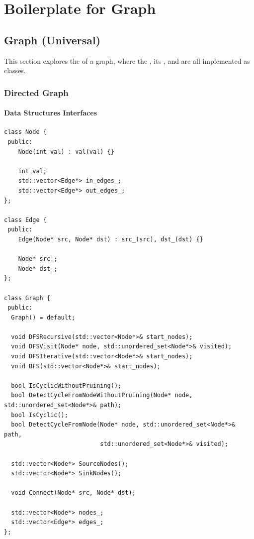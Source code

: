 \chapter{Boilerplate for Graph}\label{chap:graph_boilerplate}
\section{Graph (Universal)}
This section explores the {\color{blue}{universal implementation}} of a graph, where the {\color{blue}{graph}}, its {\color{blue}{nodes}}, and {\color{blue}{edges}} are all implemented as classes.

\subsection{Directed Graph}
\subsubsection{Data Structures Interfaces}
\begin{lstlisting}
class Node {
 public:
	Node(int val) : val(val) {}
	
	int val;
	std::vector<Edge*> in_edges_;
	std::vector<Edge*> out_edges_;
};

class Edge {
 public:
	Edge(Node* src, Node* dst) : src_(src), dst_(dst) {}
	
	Node* src_;
	Node* dst_;
};

class Graph {
 public:
  Graph() = default;

  void DFSRecursive(std::vector<Node*>& start_nodes);
  void DFSVisit(Node* node, std::unordered_set<Node*>& visited);
  void DFSIterative(std::vector<Node*>& start_nodes);
  void BFS(std::vector<Node*>& start_nodes);

  bool IsCyclicWithoutPruining();
  bool DetectCycleFromNodeWithoutPruining(Node* node, std::unordered_set<Node*>& path);
  bool IsCyclic();
  bool DetectCycleFromNode(Node* node, std::unordered_set<Node*>& path,
                           std::unordered_set<Node*>& visited);

  std::vector<Node*> SourceNodes();
  std::vector<Node*> SinkNodes();

  void Connect(Node* src, Node* dst);

  std::vector<Node*> nodes_;
  std::vector<Edge*> edges_;
};
\end{lstlisting}

